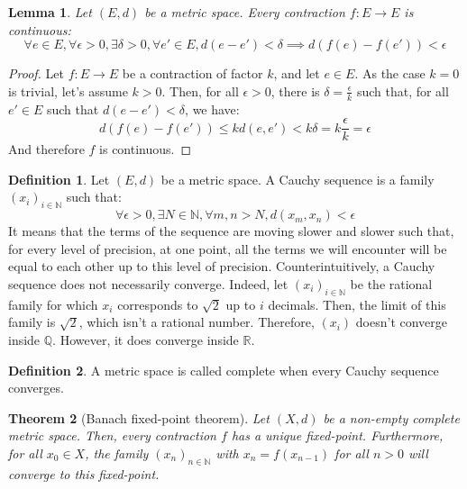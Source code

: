 \documentclass{article}
\newtheorem{theorem}{Theorem}[section]
\newtheorem{lemma}[theorem]{Lemma}
\theoremstyle{definition}
\newtheorem{definition}{Definition}[section]
\theoremstyle{remark}
\theoremstyle{example}
\begin{document}
\begin{lemma}
		Let $(E, d)$ be a metric space. Every contraction $f : E \rightarrow E$ is continuous:
				$$\forall e \in E, \forall \epsilon > 0, \exists \delta > 0, \forall e' \in E, d(e - e') < \delta \implies d(f(e) - f(e')) < \epsilon$$
\end{lemma}

\begin{proof}
		Let $f : E \rightarrow E$ be a contraction of factor $k$, and let $e \in E$. As the case $k = 0$ is trivial, let's assume $k>0$. Then, for all $\epsilon > 0$, there is $\delta = \frac{\epsilon}{k}$ such that, for all $e' \in E$ such that $d(e - e') < \delta$, we have:
				$$d(f(e) - f(e')) \leq kd(e, e') < k\delta = k\frac{\epsilon}{k} = \epsilon$$
		And therefore $f$ is continuous.
\end{proof}

\begin{definition}
    Let $(E, d)$ be a metric space. A Cauchy sequence is a family $(x_i)_{i \in \mathbb{N}}$ such that:
        $$\forall \epsilon > 0, \exists N \in \mathbb{N}, \forall m, n > N, d(x_m, x_n) < \epsilon$$
    It means that the terms of the sequence are moving slower and slower such that, for every level of precision, at one point, all the terms we will encounter will be equal to each other up to this level of precision. Counterintuitively, a Cauchy sequence does not necessarily converge. Indeed, let $(x_i)_{i \in \mathbb{N}}$ be the rational family for which $x_i$ corresponds to $\sqrt{2}$ up to $i$ decimals. Then, the limit of this family is $\sqrt{2}$, which isn't a rational number. Therefore, $(x_i)$ doesn't converge inside $\mathbb{Q}$. However, it does converge inside $\mathbb{R}$.
\end{definition}

\begin{definition}
    A metric space is called complete when every Cauchy sequence converges.
\end{definition}

\begin{theorem}[Banach fixed-point theorem]
    Let $(X, d)$ be a non-empty complete metric space. Then, every contraction $f$ has a unique fixed-point. Furthermore, for all $x_0 \in X$, the family $(x_n)_{n \in \mathbb{N}}$ with $x_n = f(x_{n-1})$ for all $n>0$ will converge to this fixed-point.
\end{theorem}
\end{document}
